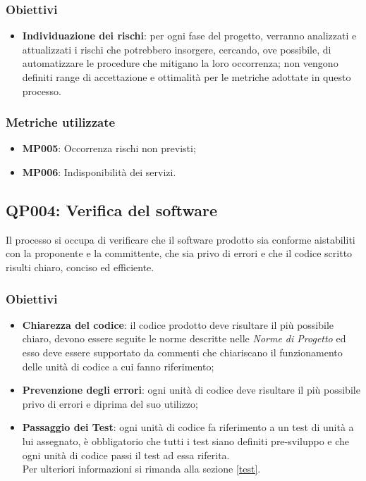 \subsubsection{Obiettivi}
\begin{itemize}
	\item \textbf{Individuazione dei rischi}: per ogni fase del progetto, verranno analizzati e attualizzati i rischi che potrebbero insorgere, cercando, ove possibile, di automatizzare le procedure che mitigano la loro occorrenza; non vengono definiti range di accettazione e ottimalità per le metriche adottate in questo processo.
\end{itemize}

\subsubsection{Metriche utilizzate}
\begin{itemize}	
	\item \textbf{MP005}: Occorrenza rischi non previsti;
	\item \textbf{MP006}: Indisponibilità dei servizi.
\end{itemize}
\subsection{QP004: Verifica del software}
Il processo si occupa di verificare che il software prodotto sia conforme aistabiliti con la proponente e la committente, che sia privo di errori e che il codice scritto risulti chiaro, conciso ed efficiente.
\subsubsection{Obiettivi}
\begin{itemize}
	\item \textbf{Chiarezza del codice}: il codice prodotto deve risultare il più possibile chiaro, devono essere seguite le norme descritte nelle \textit{Norme di Progetto} ed esso deve essere supportato da commenti che chiariscano il funzionamento delle unità di codice a cui fanno riferimento;
	\item \textbf{Prevenzione degli errori}: ogni unità di codice deve risultare il più possibile privo di errori e diprima del suo utilizzo;
	\item \textbf{Passaggio dei Test}: ogni unità di codice fa riferimento a un test di unità a lui assegnato, è obbligatorio che tutti i test siano definiti pre-sviluppo e che ogni unità di codice passi il test ad essa riferita.\\
	Per ulteriori informazioni si rimanda alla sezione \ref{test}.
\end{itemize}
